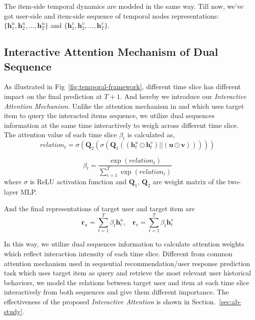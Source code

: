 The item-side temporal dynamics are modeled in the same way. Till now, we've got user-side and item-side sequence of temporal nodes representations: $\{\bm h_1^u, \bm h_2^u, ..., \bm h_T^u\}$ and $\{\bm h_1^v, \bm h_2^v, ..., \bm h_T^v\}$.

\subsection{Interactive Attention Mechanism of Dual Sequence} \label{sec:attention}
As illustrated in Fig~\ref{fig:temporal-framework}, different time slice has different impact on the final prediction at $T + 1$. And hereby we introduce our \textit{Interactive Attention Mechanism}. Unlike the attention mechanism in \cite{zhou2018deepb} and \cite{zhou2018deepa} which uses target item to query the interacted items sequence, we utilize dual sequences information at the same time interactively to weigh across different time slice.
The attention value of each time slice $\beta_t$ is calculated as,
\begin{equation}
relation_t = \sigma(\bm Q_2(\sigma(\bm Q_1((\bm h_t^u \odot \bm h_t^v) || (\bm u \odot \bm v)))))
\end{equation}

\begin{equation}
\beta_t = \frac{\exp(relation_t)}{\sum_{i=1}^T \exp(relation_i)}
\end{equation}
where $\sigma$ is ReLU activation function and $\bm Q_1$, $\bm Q_2$ are weight matrix of the two-layer MLP.

And the final representations of target user and target item are 
\begin{equation} \label{eq:seq_rep}
\bm r_u = \sum_{t=1}^T \beta_t \bm h_t^u, ~~~~\bm r_v = \sum_{t=1}^T \beta_t \bm h_t^v
\end{equation}

In this way, we utilize dual sequences information to calculate attention weights which reflect interaction intensity of each time slice. Different from common attention mechanism used in sequential recommendation/user response prediction task \cite{zhou2018deepb, zhou2018deepa} which uses target item as query and retrieve the most relevant user historical behaviors, we model the relations between target user and item at each time slice interactively from both sequences and give them different importance. The effectiveness of the proposed \textit{Interactive Attention} is shown in Section.~\ref{sec:ab-study}.

